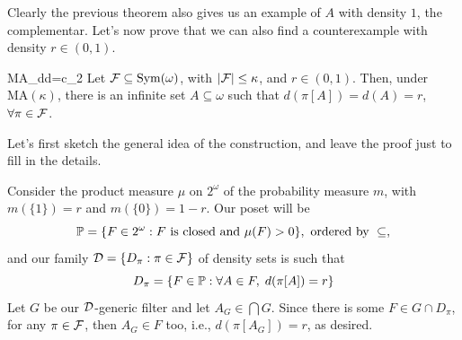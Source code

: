 Clearly the previous theorem also gives us an example of $A$ with density $1$, the complementar. Let's now prove that we can also find a counterexample with density $r\in(0,1)$.

\begin{theorem}{}{MA_dd=c_2}
    Let $\mathcal{F}\subseteq\mathrm{Sym}(\omega)$, with $\lvert\mathcal{F}\rvert\leq\kappa$, and $r\in(0,1)$. Then, under $\text{MA}(\kappa)$, there is an infinite set $A\subseteq\omega$ such that $d(\pi[A])=d(A)=r$, $\forall\pi\in\mathcal{F}$.
\end{theorem}

\begin{sketch}
    Let's first sketch the general idea of the construction, and leave the proof just to fill in the details.

    Consider the product measure $\mu$ on $2^\omega$ of the probability measure $m$, with $m(\{1\})=r$ and $m(\{0\})=1-r$. Our poset will be
    $$\mathbb{P}=\{F\in2^\omega:F\text{ is closed and }\mu(F)>0\},\text{ ordered by }\subseteq,$$
    and our family $\mathcal{D}=\{D_\pi:\pi\in\mathcal{F}\}$ of density sets is such that
    $$D_\pi=\{F\in\mathbb{P}:\forall A\in F,\;d(\pi[A])=r\}$$
    Let $G$ be our $\mathcal{D}$-generic filter and let $A_G\in\bigcap G$. Since there is some $F\in G\cap D_\pi$, for any $\pi\in\mathcal{F}$, then $A_G\in F$ too, i.e., $d(\pi[A_G])=r$, as desired.
\end{sketch}

